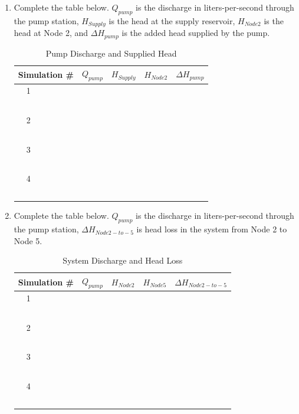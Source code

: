 \documentclass[11pt]{article}
\begin{document}
\begin{enumerate}
\begin{enumerate}
\item Complete the table below.  $Q_{pump}$ is the discharge in liters-per-second through the pump station, $H_{Supply}$ is the head at the supply reservoir,  $H_{Node2}$ is the head at Node 2, and $\Delta H_{pump}$ is the added head supplied by the pump.
\begin{table}[htbp]
   \centering
      \caption{Pump Discharge and Supplied Head}
   \begin{tabular}{p{1in} p{1in} p{1in} p{1in} p{1in} } %
Simulation \# & $Q_{pump}$ & $H_{Supply}$ & $H_{Node2}$ & $\Delta H_{pump}$ \\
\hline
\hline
~~1 & ~ &~ & ~ & ~ \\
~ & ~ &~ & ~ & ~ \\
\hline
~~2 & ~ &~ & ~ & ~ \\
~ & ~ &~ & ~ & ~ \\
\hline
~~3 & ~ &~ & ~ & ~\\
~ & ~ &~ & ~ & ~ \\
\hline
~~4 & ~ &~ & ~ & ~ \\
~ & ~ &~ & ~ & ~ \\
\hline
   \end{tabular}
   \label{tab:pump-curve}
\end{table}

\item Complete the table below.  $Q_{pump}$ is the discharge in liters-per-second through the pump station, $\Delta H_{Node 2 -to- 5}$ is head loss in the system from Node 2 to Node 5.
\begin{table}[htbp]
   \centering
      \caption{System Discharge and Head Loss}
   \begin{tabular}{p{1in} p{1in} p{1in} p{1in} p{1in} } %
Simulation \# & $Q_{pump}$ & $H_{Node2}$ & $H_{Node5}$ & $\Delta H_{Node 2 -to- 5}$ \\
\hline
\hline
~~1 & ~ &~ & ~ & ~ \\
~ & ~ &~ & ~ & ~ \\
\hline
~~2 & ~ &~ & ~ & ~ \\
~ & ~ &~ & ~ & ~ \\
\hline
~~3 & ~ &~ & ~ & ~\\
~ & ~ &~ & ~ & ~ \\
\hline
~~4 & ~ &~ & ~ & ~ \\
~ & ~ &~ & ~ & ~ \\
\hline
   \end{tabular}
   \label{tab:system-curve}
\end{table}




\end{enumerate}
\end{enumerate}
\end{document}
